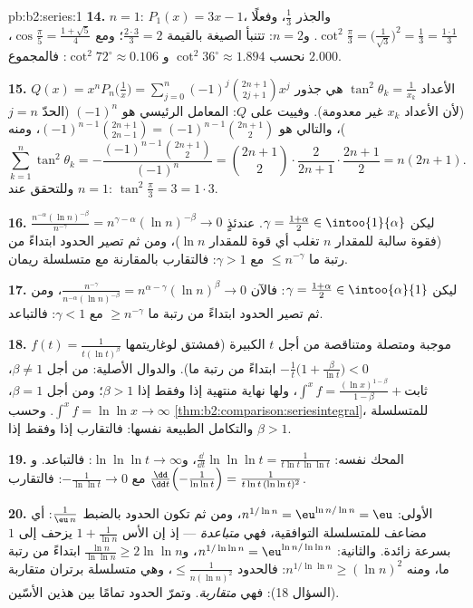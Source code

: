 \begin{solution}{pb:b2:series:1}
\textbf{14.} $n = 1$: $P_1(x) = 3x - 1$، والجذر $\frac13$، وفعلًا
$\cot^2\frac\pi3 = \bigl(\frac1{\sqrt3}\bigr)^2 =
\frac13 = \frac{1\cdot1}3$. و$n = 2$: تتنبأ الصيغة بالقيمة
$\frac{2\cdot3}3 = 2$؛ ومع $\cos\frac\pi5 = \frac{1 +
\sqrt5}{4}$، نحسب $\cot^2 36^\circ \approx 1.894$ و
$\cot^2 72^\circ \approx 0.106$: فالمجموع $2.000$.

\textbf{15.} الأعداد $\tan^2\theta_k = \frac1{x_k}$ هي
جذور $Q(x) = x^nP_n\bigl(\frac1x\bigr) =
\sum_{j=0}^n(-1)^j\binom{2n+1}{2j+1}x^j$ (لأن الأعداد $x_k$
غير معدومة). وفييت على $Q$: المعامل الرئيسي هو $(-1)^n$
(الحدّ $j = n$)، والتالي هو $(-1)^{n-1}\binom{2n+1}{2n-1} =
(-1)^{n-1}\binom{2n+1}{2}$، ومنه
\[
\sum_{k=1}^n\tan^2\theta_k =
-\frac{(-1)^{n-1}\binom{2n+1}2}{(-1)^n} = \binom{2n+1}2\cdot
\frac{2}{2n+1}\cdot\frac{2n+1}{2}
= n(2n+1).
\]
وللتحقق عند $n = 1$: $\tan^2\frac\pi3 = 3 = 1\cdot3$.

\textbf{16.} ليكن $\gamma = \frac{1+\alpha}2 \in
\intoo{1}{\alpha}$. عندئذٍ $\frac{n^{-\alpha}(\ln
n)^{-\beta}}{n^{-\gamma}} = n^{\gamma - \alpha}(\ln n)^{-\beta}
\to 0$ (فقوة سالبة للمقدار $n$ تغلب أي قوة للمقدار $\ln n$)، ومن ثم
تصير الحدود ابتداءً من رتبة ما $\leq n^{-\gamma}$ مع $\gamma > 1$:
فالتقارب بالمقارنة مع متسلسلة ريمان.

\textbf{17.} ليكن $\gamma = \frac{1+\alpha}2 \in
\intoo{\alpha}{1}$: فالآن $\frac{n^{-\gamma}}{n^{-\alpha}(\ln
n)^{-\beta}} = n^{\alpha-\gamma}(\ln n)^{\beta} \to 0$، ومن ثم
تصير الحدود ابتداءً من رتبة ما $\geq n^{-\gamma}$ مع $\gamma < 1$:
فالتباعد.

\textbf{18.} $f(t) = \frac1{t(\ln t)^\beta}$ موجبة
ومتصلة ومتناقصة من أجل $t$ الكبيرة (فمشتق لوغاريتمها
$-\frac1t\bigl(1 + \frac{\beta}{\ln t}\bigr) < 0$
ابتداءً من رتبة ما). والدوال الأصلية: من أجل $\beta \neq 1$،
$\int^x f = \frac{(\ln x)^{1-\beta}}{1-\beta} + \text{ثابت}$،
ولها نهاية منتهية إذا وفقط إذا $\beta > 1$؛ ومن أجل $\beta = 1$،
$\int^x f = \ln\ln x \to \infty$. وحسب
\cref{thm:b2:comparison:seriesintegral}، للمتسلسلة والتكامل
الطبيعة نفسها: فالتقارب إذا وفقط إذا $\beta > 1$.

\textbf{19.} المحك نفسه: $\frac{\dd}{\dd t}\ln\ln\ln t =
\frac{1}{t\ln t\,\ln\ln t}$، و$\ln\ln\ln t \to \infty$:
فالتباعد. و$\frac{\dd}{\dd t}\Bigl(-\frac1{\ln\ln t}\Bigr)
= \frac{1}{t\ln t\,(\ln\ln t)^2}$ مع $-\frac1{\ln\ln t} \to
0$: فالتقارب.

\textbf{20.} الأولى: $n^{1/\ln n} = \eu^{\ln n/\ln n} = \eu$، ومن ثم
تكون الحدود بالضبط $\frac{1}{\eu\,n}$: أي مضاعف للمتسلسلة
التوافقية، فهي \emph{متباعدة} --- إذ إن الأس $1 +
\frac1{\ln n}$ يزحف إلى $1$ بسرعة زائدة. والثانية: $n^{1/\ln\ln n}
= \eu^{\ln n/\ln\ln n}$، و$\frac{\ln n}{\ln\ln n} \geq
2\ln\ln n$ ابتداءً من رتبة ما، ومنه $n^{1/\ln\ln n} \geq (\ln n)^2$:
فالحدود $\leq \frac1{n(\ln n)^2}$، وهي متسلسلة برتران متقاربة
(السؤال 18): فهي \emph{متقاربة}. وتمرّ الحدود
تمامًا بين هذين الأسّين.


\end{solution}
